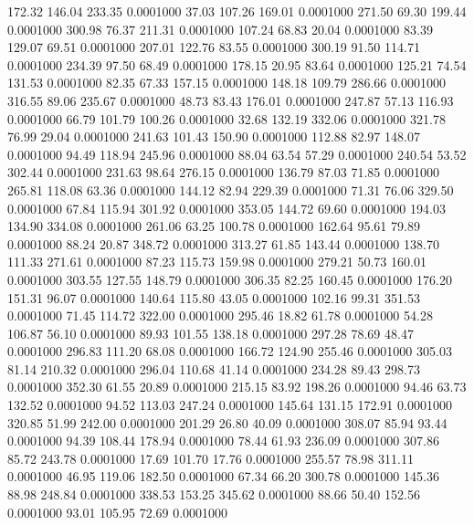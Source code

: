  172.32  146.04  233.35   0.0001000
  37.03  107.26  169.01   0.0001000
 271.50   69.30  199.44   0.0001000
 300.98   76.37  211.31   0.0001000
 107.24   68.83   20.04   0.0001000
  83.39  129.07   69.51   0.0001000
 207.01  122.76   83.55   0.0001000
 300.19   91.50  114.71   0.0001000
 234.39   97.50   68.49   0.0001000
 178.15   20.95   83.64   0.0001000
 125.21   74.54  131.53   0.0001000
  82.35   67.33  157.15   0.0001000
 148.18  109.79  286.66   0.0001000
 316.55   89.06  235.67   0.0001000
  48.73   83.43  176.01   0.0001000
 247.87   57.13  116.93   0.0001000
  66.79  101.79  100.26   0.0001000
  32.68  132.19  332.06   0.0001000
 321.78   76.99   29.04   0.0001000
 241.63  101.43  150.90   0.0001000
 112.88   82.97  148.07   0.0001000
  94.49  118.94  245.96   0.0001000
  88.04   63.54   57.29   0.0001000
 240.54   53.52  302.44   0.0001000
 231.63   98.64  276.15   0.0001000
 136.79   87.03   71.85   0.0001000
 265.81  118.08   63.36   0.0001000
 144.12   82.94  229.39   0.0001000
  71.31   76.06  329.50   0.0001000
  67.84  115.94  301.92   0.0001000
 353.05  144.72   69.60   0.0001000
 194.03  134.90  334.08   0.0001000
 261.06   63.25  100.78   0.0001000
 162.64   95.61   79.89   0.0001000
  88.24   20.87  348.72   0.0001000
 313.27   61.85  143.44   0.0001000
 138.70  111.33  271.61   0.0001000
  87.23  115.73  159.98   0.0001000
 279.21   50.73  160.01   0.0001000
 303.55  127.55  148.79   0.0001000
 306.35   82.25  160.45   0.0001000
 176.20  151.31   96.07   0.0001000
 140.64  115.80   43.05   0.0001000
 102.16   99.31  351.53   0.0001000
  71.45  114.72  322.00   0.0001000
 295.46   18.82   61.78   0.0001000
  54.28  106.87   56.10   0.0001000
  89.93  101.55  138.18   0.0001000
 297.28   78.69   48.47   0.0001000
 296.83  111.20   68.08   0.0001000
 166.72  124.90  255.46   0.0001000
 305.03   81.14  210.32   0.0001000
 296.04  110.68   41.14   0.0001000
 234.28   89.43  298.73   0.0001000
 352.30   61.55   20.89   0.0001000
 215.15   83.92  198.26   0.0001000
  94.46   63.73  132.52   0.0001000
  94.52  113.03  247.24   0.0001000
 145.64  131.15  172.91   0.0001000
 320.85   51.99  242.00   0.0001000
 201.29   26.80   40.09   0.0001000
 308.07   85.94   93.44   0.0001000
  94.39  108.44  178.94   0.0001000
  78.44   61.93  236.09   0.0001000
 307.86   85.72  243.78   0.0001000
  17.69  101.70   17.76   0.0001000
 255.57   78.98  311.11   0.0001000
  46.95  119.06  182.50   0.0001000
  67.34   66.20  300.78   0.0001000
 145.36   88.98  248.84   0.0001000
 338.53  153.25  345.62   0.0001000
  88.66   50.40  152.56   0.0001000
  93.01  105.95   72.69   0.0001000
